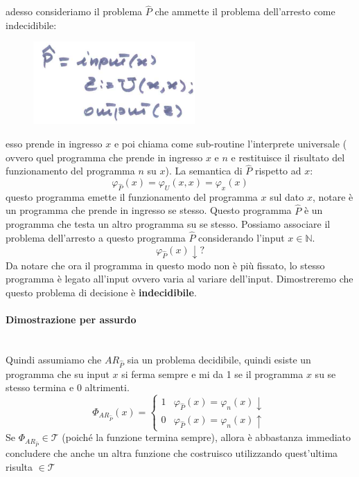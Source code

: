 \documentclass{article}
\begin{document}
adesso consideriamo il problema $\hat{P}$ che ammette il problema dell'arresto come
indecidibile:
\begin{figure}[H]
    \centering
    \includegraphics[scale=0.5]{images/programma_P_hat.png}
\end{figure}
esso prende in ingresso $x$ e poi chiama come sub-routine l'interprete universale (
ovvero quel programma che prende in ingresso $x$ e $n$ e restituisce il risultato
del funzionamento del programma $n$ su $x$). La semantica di $\hat{P}$ rispetto
ad $x$:
$$\varphi_{\hat{P}}(x)=\varphi_U(x,x)=\varphi_x(x)$$
questo programma emette il funzionamento del programma $x$ sul dato $x$, notare è un
programma che prende in ingresso se stesso. Questo programma $\hat{P}$ è un programma
che testa un altro programma su se stesso.
Possiamo associare il problema dell'arresto a questo programma $\hat{P}$ considerando
l'input $x\in\mathbb{N}$.
$$\varphi_{\hat{P}}(x)\downarrow?$$
Da notare che ora il programma in questo modo non è più fissato, lo stesso programma
è legato all'input ovvero varia al variare dell'input. Dimostreremo che
questo problema di decisione è \textbf{indecidibile}.

\paragraph{Dimostrazione per assurdo}\mbox{}\\
Quindi assumiamo che $AR_{\hat{P}}$ sia un problema decidibile, quindi esiste un programma
che su input $x$ si ferma sempre e mi da 1 se il programma $x$ su se stesso termina e 0 altrimenti.
\[
    \Phi_{AR_{\hat{P}}}(x)=
    \begin{cases}
        1 & \varphi_{\hat{P}}(x)=\varphi_n(x)\downarrow \\
        0 & \varphi_{\hat{P}}(x)=\varphi_n(x)\uparrow
    \end{cases}
\]
Se $\Phi_{AR_{\hat{P}}}\in\mathcal{T}$ (poiché la funzione termina sempre), allora è abbastanza
immediato concludere che anche un altra funzione che costruisco utilizzando quest'ultima
risulta $\in\mathcal{T}$
\end{document}
